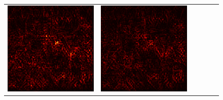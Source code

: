 \documentclass[preprint,12pt]{elsarticle}
\begin{document}
\begin{figure}[ht]
\begin{tabular}{cccccc}
  \includegraphics[scale=\scale]{../visualizations/examples/imagenette/resnet18/positive_saliency_map/2.png} & 
  \includegraphics[scale=\scale]{../visualizations/examples/imagenette/resnet18/negative_saliency_map/2.png} & 

\end{tabular}
\end{figure}
\end{document}
